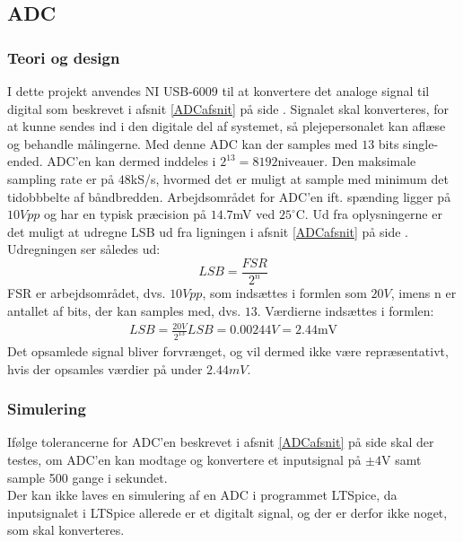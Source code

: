 \subsection{ADC}
\subsubsection{Teori og design}
I dette projekt anvendes NI USB-6009 til at konvertere det analoge signal til digital som beskrevet i afsnit \ref{ADCafsnit} på side \pageref{ADCafsnit}. Signalet skal konverteres, for at kunne sendes ind i den digitale del af systemet, så plejepersonalet kan aflæse og behandle målingerne. Med denne ADC kan der samples med $13$ bits single-ended. ADC'en kan dermed inddeles i $2^{13} = 8192 \text{niveauer}$. Den maksimale sampling rate er på $48$kS/s, hvormed det er muligt at sample med minimum det tidobbbelte af båndbredden. Arbejdsområdet for ADC'en ift. spænding ligger på $10Vpp$ og har en typisk præcision på $14.7$mV ved $25^{\circ}$C. \cite{Instruments2014} Ud fra oplysningerne er det muligt at udregne LSB ud fra ligningen i afsnit \ref{ADCafsnit} på side \pageref{ADCafsnit}. Udregningen ser således ud: \\
\begin{equation}
	LSB = \frac{FSR}{2^{n}} 
\end{equation}  
FSR er arbejdsområdet, dvs. $10Vpp$, som indsættes i formlen som $20V$, imens n er antallet af bits, der kan samples med, dvs. $13$.
Værdierne indsættes i formlen: \\
\begin{align}
	LSB = \frac{20V}{2^{13}}
	LSB = 0.00244V = 2.44\text{mV}
\end{align}
Det opsamlede signal bliver forvrænget, og vil dermed ikke være repræsentativt, hvis der opsamles værdier på under $2.44mV$.\\
\subsubsection{Simulering}
Ifølge tolerancerne for ADC'en beskrevet i afsnit \ref{ADCafsnit} på side \pageref{ADCafsnit} skal der testes, om ADC'en kan modtage og konvertere et inputsignal på $\pm4$V samt sample 500 gange i sekundet. \\
Der kan ikke laves en simulering af en ADC i programmet LTSpice, da inputsignalet i LTSpice allerede er et digitalt signal, og der er derfor ikke noget, som skal konverteres.
 
